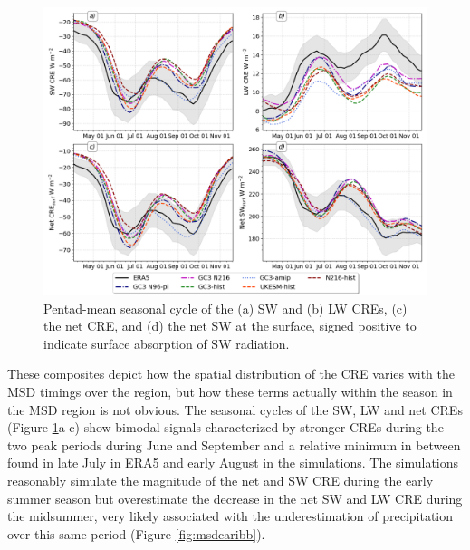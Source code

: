 \begin{figure}[t!]
\includegraphics[width=\linewidth]{figures/cre_index_seasonal.png}
\caption[Seasonal cycle of cloud-radiative effects]{Pentad-mean seasonal cycle of the (a) SW and (b)  LW CREs, (c) the net CRE, and (d) the net SW at the surface, signed positive to indicate surface absorption of SW radiation.}
\label{fig:cre_seasonal}
\end{figure}

These composites depict how the spatial distribution of the CRE varies with the MSD timings over the region, but how these terms actually within the season in the MSD region is not obvious. The seasonal cycles of the SW, LW and net CREs (Figure \ref{fig:cre_seasonal}a-c) show bimodal signals characterized by stronger CREs during the two peak periods during June and September and a relative minimum in between found in late July in ERA5 and early August in the simulations. The simulations reasonably simulate the magnitude of the net and SW CRE during the early summer season but overestimate the decrease in the net SW and LW CRE during the midsummer, very likely associated with the underestimation of precipitation over this same period (Figure \ref{fig:msdcaribb}).

